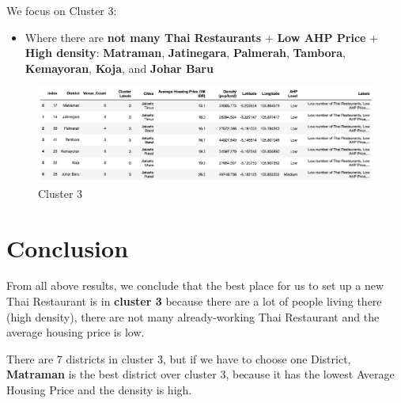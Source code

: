\documentclass[12pt,a4paper]{article}
\begin{document}
\clearpage

We focus on Cluster 3: 

\begin{itemize}
\item Where there are \textbf{not many Thai Restaurants} + \textbf{Low AHP Price} + \textbf{High density}: \textbf{Matraman}, \textbf{Jatinegara}, \textbf{Palmerah}, \textbf{Tambora}, \textbf{Kemayoran}, \textbf{Koja}, and \textbf{Johar Baru}
\end{itemize}

\begin{center}
    \begin{figure}[htp]
    \begin{center}
     \includegraphics[width=\textwidth]{fig/result}
    \end{center}
    \caption{Cluster 3}
    \label{fig:result}
    \end{figure}
\end{center}

\section{Conclusion}

From all above results, we conclude that the best place for us to set up a new Thai Restaurant is in \textbf{cluster 3} because there are a lot of people living there (high density), there are not many already-working Thai Restaurant and the average housing price is low.

There are 7 districts in cluster 3, but if we have to choose one District, \textbf{Matraman} is the best district over cluster 3, because it has the lowest Average Housing Price and the density is high.
\end{document}
